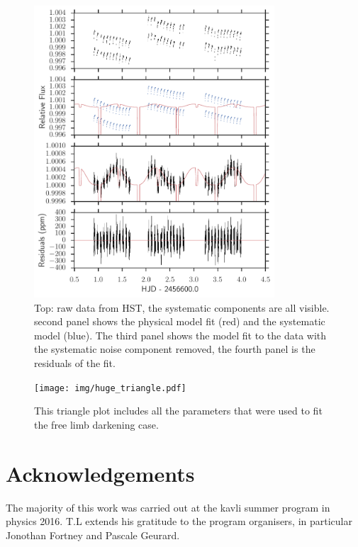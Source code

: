 \documentclass[a4paper,fleqn,usenatbib]{mnras}
\begin{document}
\begin{figure}
\begin{center}
\includegraphics[width=0.8\textwidth]{img/systematics.pdf}
\caption{Top: raw data from HST, the systematic components are all visible. second panel shows the physical model fit (red) and the systematic model (blue). The third panel shows the model fit to the data with the systematic noise component removed, the fourth panel is the residuals of the fit.
}
\label{fig:systematics}
\end{center}
\end{figure}

\begin{figure}
\begin{center}
\texttt{[image: img/huge\_triangle.pdf]}
\caption{This triangle plot includes all the parameters that were used to fit the free limb darkening case.}
\label{fig:big triangle}
\end{center}
\end{figure}

\section*{Acknowledgements}

The majority of this work was carried out at the kavli summer program in physics 2016. T.L extends his gratitude to the program organisers, in particular Jonothan Fortney and Pascale Geurard.
\end{document}
